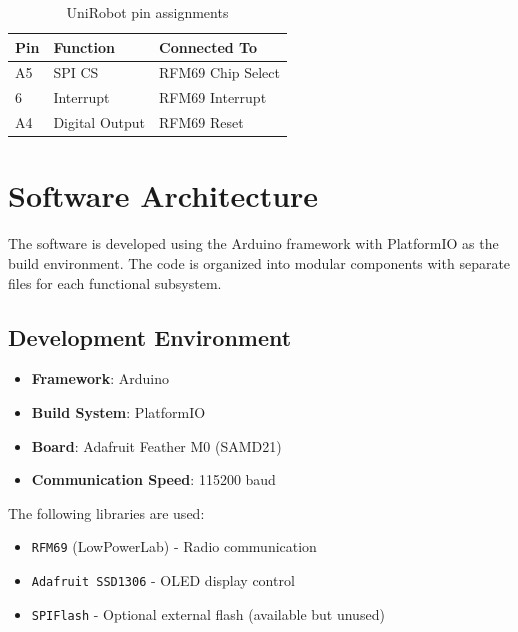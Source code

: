 \begin{table}[H]
    \centering
    \caption{UniRobot pin assignments}
    \label{tab:robot_pins}
    \begin{tabular}{|l|l|l|}
        \hline
        \textbf{Pin} & \textbf{Function} & \textbf{Connected To} \\
        \hline
        A5 & SPI CS & RFM69 Chip Select \\
        6 & Interrupt & RFM69 Interrupt \\
        A4 & Digital Output & RFM69 Reset \\
        \hline
    \end{tabular}
\end{table}

\section{Software Architecture}

The software is developed using the Arduino framework with PlatformIO as the build environment. The code is organized into modular components with separate files for each functional subsystem.

\subsection{Development Environment}

\begin{itemize}
    \item \textbf{Framework}: Arduino
    \item \textbf{Build System}: PlatformIO
    \item \textbf{Board}: Adafruit Feather M0 (SAMD21)
    \item \textbf{Communication Speed}: 115200 baud
\end{itemize}

The following libraries are used:
\begin{itemize}
    \item \texttt{RFM69} (LowPowerLab) - Radio communication
    \item \texttt{Adafruit SSD1306} - OLED display control
    \item \texttt{SPIFlash} - Optional external flash (available but unused)
\end{itemize}

